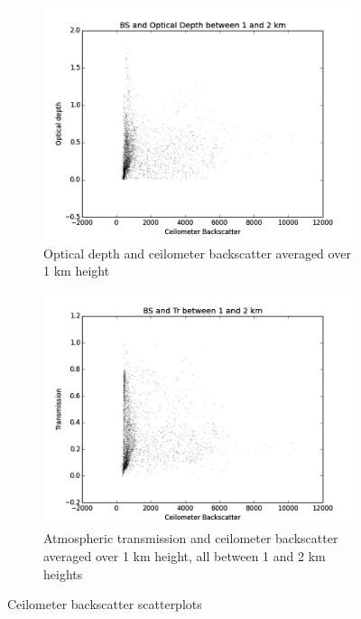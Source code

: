 \documentclass[a4paper,titlepage, twoside]{report}
\begin{document}
\begin{figure}
\begin{subfigure}{0.48\textwidth}
\includegraphics[width=\textwidth]{BS1_tau.png}
\caption{Optical depth and ceilometer backscatter averaged over 1 km height}
\end{subfigure}
\hfill
\begin{subfigure}{0.48\textwidth}
\includegraphics[width=\textwidth]{BS1_Tr.png}
\caption{Atmospheric transmission and ceilometer backscatter averaged over 1 km height, all  between 1 and 2 km heights}
\end{subfigure}
\caption{Ceilometer backscatter scatterplots}
\label{fig:data-9}
\end{figure}
\end{document}
